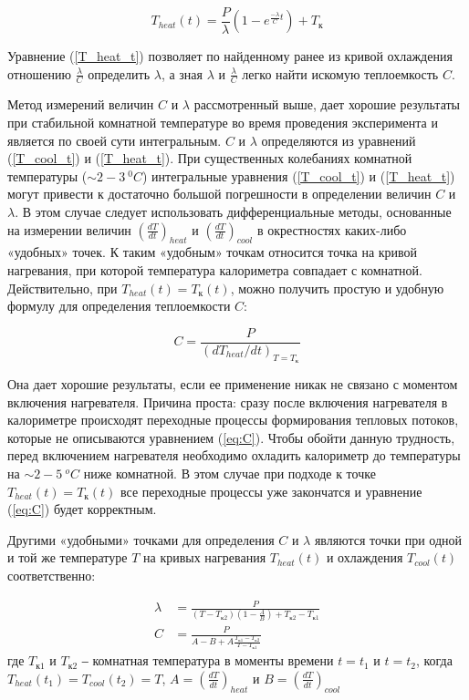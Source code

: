     \begin{equation}
        T_{heat}(t) = \frac{P}{\lambda} (1 - e^{\frac{-\lambda}{C} t}) + T_{\text{к}}
        \label{T_heat_t}
    \end{equation}

    Уравнение (\ref{T_heat_t}) позволяет по найденному ранее из кривой охлаждения отношению $\frac{\lambda}{C}$ определить $\lambda$, а зная $\lambda$ и $\frac{\lambda}{C}$ легко найти искомую теплоемкость $C$.

    Метод измерений величин $C$ и $\lambda$ рассмотренный выше, дает хорошие результаты при стабильной комнатной температуре во время проведения эксперимента и является по своей сути интегральным. $C$ и $\lambda$ определяются из уравнений (\ref{T_cool_t}) и (\ref{T_heat_t}). При существенных колебаниях комнатной температуры ($\sim 2-3~^0C$) интегральные уравнения (\ref{T_cool_t}) и (\ref{T_heat_t}) могут привести к достаточно большой погрешности в определении величин $C$ и $\lambda$. В этом случае следует использовать дифференциальные методы, основанные на измерении величин $\left( \frac{dT}{dt} \right)_{heat}$ и $\left( \frac{dT}{dt} \right)_{cool}$ в окрестностях каких-либо «удобных» точек. К таким «удобным» точкам относится точка на кривой нагревания, при которой температура калориметра совпадает с комнатной. Действительно, при $T_{heat}(t) = T_{\text{к}}(t)$, можно получить простую и удобную формулу для определения теплоемкости $C$:

    \begin{equation}
        C = \frac{P}{(dT_{heat} / dt)_{T = T_{\text{к}}}}
        \label{eq:C}
    \end{equation}

    Она дает хорошие результаты, если ее применение никак не связано с моментом включения нагревателя. Причина проста: сразу после включения нагревателя в калориметре происходят переходные процессы формирования тепловых потоков, которые не описываются уравнением (\ref{eq:C}). Чтобы обойти данную трудность, перед включением нагревателя необходимо охладить калориметр до температуры на $\sim 2-5~^oC$ ниже комнатной. В этом случае при подходе к точке $T_{heat}(t) = T_{\text{к}}(t)$ все переходные процессы уже закончатся и уравнение (\ref{eq:C}) будет корректным.

    Другими «удобными» точками для определения $C$ и $\lambda$ являются точки при одной и той же температуре $T$ на кривых нагревания $T_{heat}(t)$ и охлаждения $T_{cool}(t)$ соответственно:

    \begin{align}
        \lambda &= \frac{P}{(T - T_{\text{к2}})(1 - \frac{A}{B}) + T_{\text{к2}} - T_{\text{к1}}} \label{eq:lambda}\\
        C &= \frac{P}{A - B + A \frac{T_{\text{к1}} - T_{\text{к2}}}{T - T_{\text{к1}}}} \label{eq:C2}
    \end{align}
    где $T_{\text{к1}}$ и $T_{\text{к2}}$ ‒ комнатная температура в моменты времени $t = t_1$ и $t = t_2$, когда $T_{heat}(t_1) = T_{cool}(t_2) = T$, $A = \left( \frac{dT}{dt} \right)_{heat}$ и $B = \left( \frac{dT}{dt} \right)_{cool}$

